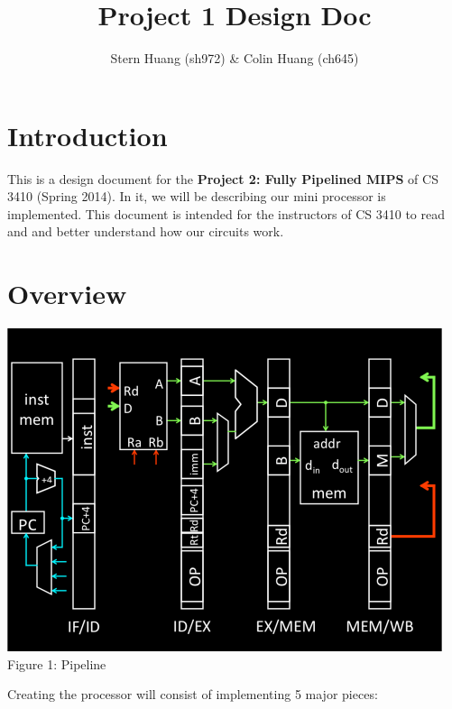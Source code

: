 \documentclass{article}
\begin{document}
\title{Project 1 Design Doc}
\author{Stern Huang (sh972) \& Colin Huang (ch645)}
\maketitle
\section{Introduction}
This is a design document for the \textbf{Project 2: Fully Pipelined MIPS} of CS 3410 (Spring 2014). In it, we will be describing our mini processor is implemented. This document is intended for the instructors of CS 3410 to read and and better understand how our circuits work. \\

\section{Overview}
\begin{center}
\includegraphics[scale=1.3]{pipeline.png} \\
Figure 1: Pipeline
\end{center}
\newpage
Creating the processor will consist of implementing 5 major pieces: \vspace{-3mm}\\ 
\end{document}
